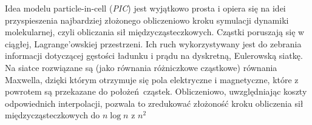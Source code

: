     Idea modelu particle-in-cell (\emph{PIC}) jest wyjątkowo prosta i opiera się na idei
    przyspieszenia najbardziej złożonego obliczeniowo kroku symulacji dynamiki
    molekularnej, czyli obliczania sił międzycząsteczkowych. Cząstki poruszają
    się w ciągłej, Lagrange'owskiej przestrzeni.  Ich ruch wykorzystywany jest
    do zebrania informacji dotyczącej gęstości ładunku i prądu na dyskretną,
    Eulerowską siatkę. Na siatce rozwiązane są (jako równania różniczkowe
    cząstkowe) równania Maxwella, dzięki którym otrzymuje się pola elektryczne
    i magnetyczne, które z powrotem są przekazane do położeń cząstek.
    Obliczeniowo, uwzględniając koszty odpowiednich interpolacji, pozwala to
    zredukować złożoność kroku obliczenia sił międzycząsteczkowych do $n
    \log{n}$ z $n^2$ 

